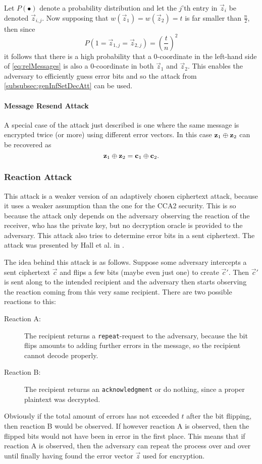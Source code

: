 Let $P\left(\bullet\right)$ denote a probability distribution and let the $j$'th entry in $\vec{z}_i$ be denoted $\vec{z}_{i,j}$. Now supposing that $w\left(\vec{z}_1\right) = w\left(\vec{z}_2\right) = t$ is far smaller than $\frac{n}{2}$, then since
\[
	P\left(1 = \vec{z}_{1,j} = \vec{z}_{2,j}\right) = \left( \frac{t}{n} \right)^2
\]
it follows that there is a high probability that a $0$-coordinate in the left-hand side of \cref{eq:relMessages} is also a $0$-coordinate in both $\vec{z}_1$ and $\vec{z}_2$. This enables the adversary to efficiently guess error bits and so the attack from \cref{subsubsec:genInfSetDecAtt} can be used.



\paragraph{Message Resend Attack}
\label{par:mesResAtt}

A special case of the attack just described is one where the same message is encrypted twice (or more) using different error vectors. In this case $\boldsymbol{\mathrm{z}}_1 \mathbin{\oplus} \boldsymbol{\mathrm{z}}_2$ can be recovered as
\[
	\boldsymbol{\mathrm{z}}_1 \mathbin{\oplus} \boldsymbol{\mathrm{z}}_2 = \boldsymbol{\mathrm{c}}_1 \mathbin{\oplus} \boldsymbol{\mathrm{c}}_2.
\]



\subsubsection{Reaction Attack}
\label{subsubsec:reaAtt}

This attack is a weaker version of an adaptively chosen ciphertext attack, because it uses a weaker assumption than the one for the CCA2 security. This is so because the attack only depends on the adversary observing the reaction of the receiver, who has the private key, but no decryption oracle is provided to the adversary. This attack also tries to determine error bits in a sent ciphertext. The attack was presented by Hall et al. in \cite{HGS}.

The idea behind this attack is as follows. Suppose some adversary intercepts a sent ciphertext $\vec{c}$ and flips a few bits (maybe even just one) to create $\vec{c}'$. Then $\vec{c}'$ is sent along to the intended recipient and the adversary then starts observing the reaction coming from this very same recipient. There are two possible reactions to this:
\begin{description}
	\item[Reaction A:] The recipient returns a \texttt{repeat}-request to the adversary, because the bit flips amounts to adding further errors in the message, so the recipient cannot decode properly.
	\item[Reaction B:] The recipient returns an \texttt{acknowledgment} or do nothing, since a proper plaintext was decrypted.
\end{description}
Obviously if the total amount of errors has not exceeded $t$ after the bit flipping, then reaction B would be observed. If however reaction A is observed, then the flipped bits would not have been in error in the first place. This means that if reaction A is observed, then the adversary can repeat the process over and over until finally having found the error vector $\vec{z}$ used for encryption.

